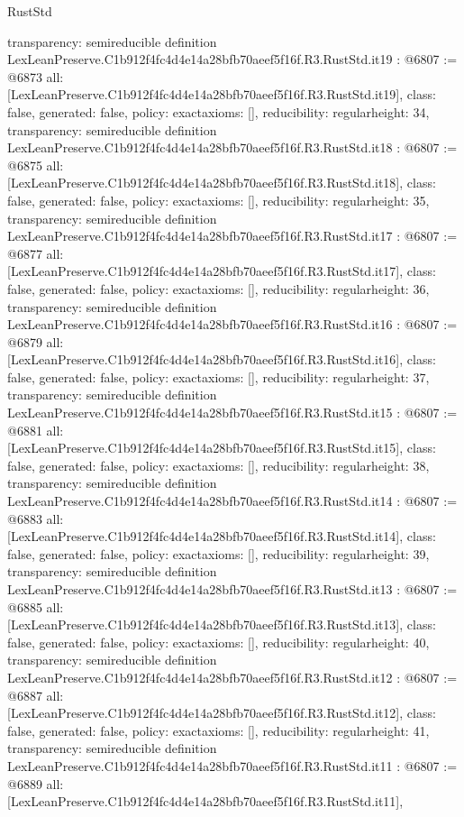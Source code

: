 \begin{lexlean}{RustStd}
\begin{coremodule}
{  transparency: semireducible
}
definition LexLeanPreserve.C1b912f4fc4d4e14a28bfb70aeef5f16f.R3.RustStd.it19 : @6807 := @6873 {
  all: [LexLeanPreserve.C1b912f4fc4d4e14a28bfb70aeef5f16f.R3.RustStd.it19],
  class: false,
  generated: false,
  policy: exact{axioms: []},
  reducibility: regular{height: 34},
  transparency: semireducible
}
definition LexLeanPreserve.C1b912f4fc4d4e14a28bfb70aeef5f16f.R3.RustStd.it18 : @6807 := @6875 {
  all: [LexLeanPreserve.C1b912f4fc4d4e14a28bfb70aeef5f16f.R3.RustStd.it18],
  class: false,
  generated: false,
  policy: exact{axioms: []},
  reducibility: regular{height: 35},
  transparency: semireducible
}
definition LexLeanPreserve.C1b912f4fc4d4e14a28bfb70aeef5f16f.R3.RustStd.it17 : @6807 := @6877 {
  all: [LexLeanPreserve.C1b912f4fc4d4e14a28bfb70aeef5f16f.R3.RustStd.it17],
  class: false,
  generated: false,
  policy: exact{axioms: []},
  reducibility: regular{height: 36},
  transparency: semireducible
}
definition LexLeanPreserve.C1b912f4fc4d4e14a28bfb70aeef5f16f.R3.RustStd.it16 : @6807 := @6879 {
  all: [LexLeanPreserve.C1b912f4fc4d4e14a28bfb70aeef5f16f.R3.RustStd.it16],
  class: false,
  generated: false,
  policy: exact{axioms: []},
  reducibility: regular{height: 37},
  transparency: semireducible
}
definition LexLeanPreserve.C1b912f4fc4d4e14a28bfb70aeef5f16f.R3.RustStd.it15 : @6807 := @6881 {
  all: [LexLeanPreserve.C1b912f4fc4d4e14a28bfb70aeef5f16f.R3.RustStd.it15],
  class: false,
  generated: false,
  policy: exact{axioms: []},
  reducibility: regular{height: 38},
  transparency: semireducible
}
definition LexLeanPreserve.C1b912f4fc4d4e14a28bfb70aeef5f16f.R3.RustStd.it14 : @6807 := @6883 {
  all: [LexLeanPreserve.C1b912f4fc4d4e14a28bfb70aeef5f16f.R3.RustStd.it14],
  class: false,
  generated: false,
  policy: exact{axioms: []},
  reducibility: regular{height: 39},
  transparency: semireducible
}
definition LexLeanPreserve.C1b912f4fc4d4e14a28bfb70aeef5f16f.R3.RustStd.it13 : @6807 := @6885 {
  all: [LexLeanPreserve.C1b912f4fc4d4e14a28bfb70aeef5f16f.R3.RustStd.it13],
  class: false,
  generated: false,
  policy: exact{axioms: []},
  reducibility: regular{height: 40},
  transparency: semireducible
}
definition LexLeanPreserve.C1b912f4fc4d4e14a28bfb70aeef5f16f.R3.RustStd.it12 : @6807 := @6887 {
  all: [LexLeanPreserve.C1b912f4fc4d4e14a28bfb70aeef5f16f.R3.RustStd.it12],
  class: false,
  generated: false,
  policy: exact{axioms: []},
  reducibility: regular{height: 41},
  transparency: semireducible
}
definition LexLeanPreserve.C1b912f4fc4d4e14a28bfb70aeef5f16f.R3.RustStd.it11 : @6807 := @6889 {
  all: [LexLeanPreserve.C1b912f4fc4d4e14a28bfb70aeef5f16f.R3.RustStd.it11],
}
\end{coremodule}
\end{lexlean}
